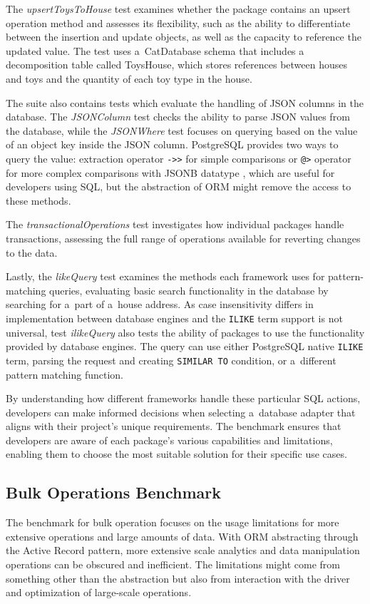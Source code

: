 The \textit{upsertToysToHouse} test examines whether the package contains an
upsert operation method and assesses its flexibility, such as the ability to
differentiate between the insertion and update objects, as well as the capacity
to reference the updated value. The test uses a~CatDatabase schema that includes
a decomposition table called ToysHouse, which stores references between houses
and toys and the quantity of each toy type in the house.

The suite also contains tests which evaluate the handling of JSON columns in the
database. The \textit{JSONColumn} test checks the ability to parse JSON values
from the database, while the \textit{JSONWhere} test focuses on querying based
on the value of an object key inside the JSON column. PostgreSQL provides two
ways to query the value: extraction operator \texttt{->>} for simple comparisons
or \texttt{@>} operator for more complex comparisons with JSONB datatype
\cite{postgres-json}, which are useful for developers using SQL, but the
abstraction of ORM might remove the access to these methods.

The \textit{transactionalOperations} test investigates how individual packages
handle transactions, assessing the full range of operations available for
reverting changes to the data.

Lastly, the \textit{likeQuery} test examines the methods each framework uses for
pattern-matching queries, evaluating basic search functionality in the database
by searching for a~part of a~house address. As case insensitivity differs in
implementation between database engines and the \texttt{ILIKE} term support is
not universal, test \textit{ilikeQuery} also tests the ability of packages to
use the functionality provided by database engines. The query can use either
PostgreSQL native \texttt{ILIKE} term, parsing the request and creating
\texttt{SIMILAR TO} condition, or a~different pattern matching function. 

By understanding how different frameworks handle these particular SQL actions,
developers can make informed decisions when selecting a~database adapter that
aligns with their project's unique requirements. The benchmark ensures that
developers are aware of each package's various capabilities and limitations,
enabling them to choose the most suitable solution for their specific use cases.

\subsection*{Bulk Operations Benchmark}
The benchmark for bulk operation focuses on the usage limitations for more
extensive operations and large amounts of data. With ORM abstracting through the
Active Record pattern, more extensive scale analytics and data manipulation
operations can be obscured and inefficient. The limitations might come from
something other than the abstraction but also from interaction with the driver
and optimization of large-scale operations.

